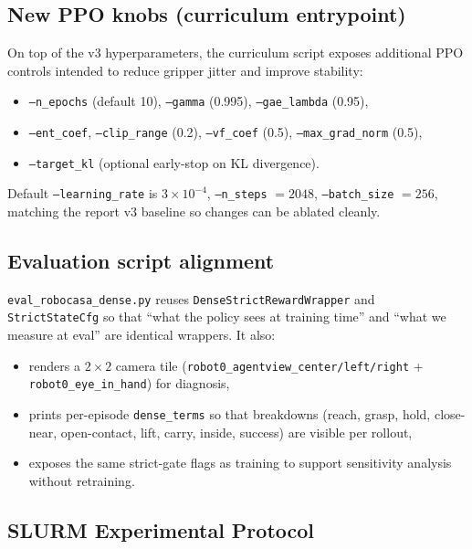\documentclass[11pt]{article}
\begin{document}
\subsection{New PPO knobs (curriculum entrypoint)}
On top of the v3 hyperparameters, the curriculum script exposes additional
PPO controls intended to reduce gripper jitter and improve stability:
\begin{itemize}
  \item \texttt{--n\_epochs} (default 10), \texttt{--gamma} (0.995),
    \texttt{--gae\_lambda} (0.95),
  \item \texttt{--ent\_coef}, \texttt{--clip\_range} (0.2),
    \texttt{--vf\_coef} (0.5), \texttt{--max\_grad\_norm} (0.5),
  \item \texttt{--target\_kl} (optional early-stop on KL divergence).
\end{itemize}
Default \texttt{--learning\_rate} is $3\times 10^{-4}$,
\texttt{--n\_steps} $= 2048$, \texttt{--batch\_size} $= 256$, matching the
report v3 baseline so changes can be ablated cleanly.

\subsection{Evaluation script alignment}
\texttt{eval\_robocasa\_dense.py} reuses \texttt{DenseStrictRewardWrapper} and
\texttt{StrictStateCfg} so that ``what the policy sees at training time'' and
``what we measure at eval'' are identical wrappers. It also:
\begin{itemize}
  \item renders a $2 \times 2$ camera tile
    (\texttt{robot0\_agentview\_center/left/right} +
    \texttt{robot0\_eye\_in\_hand}) for diagnosis,
  \item prints per-episode \texttt{dense\_terms} so that breakdowns (reach,
    grasp, hold, close-near, open-contact, lift, carry, inside, success) are
    visible per rollout,
  \item exposes the same strict-gate flags as training to support sensitivity
    analysis without retraining.
\end{itemize}

\subsection{SLURM Experimental Protocol}
\label{sec:slurm}
\end{document}
